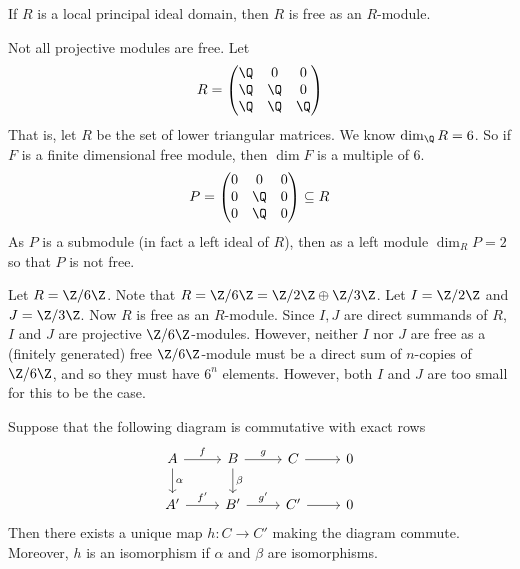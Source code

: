 \begin{rem}
If $R$ is a local principal ideal domain, then $R$ is free as an $R$-module.  
\end{rem}


\begin{ex}
Not all projective modules are free. Let
	\[
	R=\begin{pmatrix} \Q & 0 & 0 \\ \Q & \Q & 0 \\ \Q & \Q & \Q \end{pmatrix}
	\]
That is, let $R$ be the set of lower triangular matrices. We know $\dim_\Q R=6$. So if $F$ is a finite dimensional free module, then $\dim F$ is a multiple of 6.
	\[
	P=\begin{pmatrix} 0 & 0 & 0 \\ 0 & \Q & 0 \\ 0 & \Q & 0 \end{pmatrix} \subseteq R
	\]
As $P$ is a submodule (in fact a left ideal of $R$), then as a left module $\dim_R P=2$ so that $P$ is not free. \xqed
\end{ex}


\begin{ex}
Let $R=\Z/6\Z$. Note that $R=\Z/6\Z=\Z/2\Z \oplus \Z/3\Z$. Let $I=\Z/2\Z$ and $J=\Z/3\Z$. Now $R$ is free as an $R$-module. Since $I,J$ are direct summands of $R$, $I$ and $J$ are projective $\Z/6\Z$-modules. However, neither $I$ nor $J$ are free as a (finitely generated) free $\Z/6\Z$-module must be a direct sum of $n$-copies of $\Z/6\Z$, and so they must have $6^n$ elements. However, both $I$ and $J$ are too small for this to be the case. \xqed
\end{ex}


\begin{prop}
Suppose that the following diagram is commutative with exact rows
	\[
	\begin{tikzcd}
	A \arrow{r}{f} \arrow{d}{\alpha} & B \arrow{r}{g} \arrow{d}{\beta} & C \arrow{r} & 0 \\
	A' \arrow{r}{f'} & B' \arrow{r}{g'} & C' \arrow{r} & 0
	\end{tikzcd}
	\]
Then there exists a unique map $h: C \to C'$ making the diagram commute. Moreover, $h$ is an isomorphism if $\alpha$ and $\beta$ are isomorphisms. 
\end{prop}

